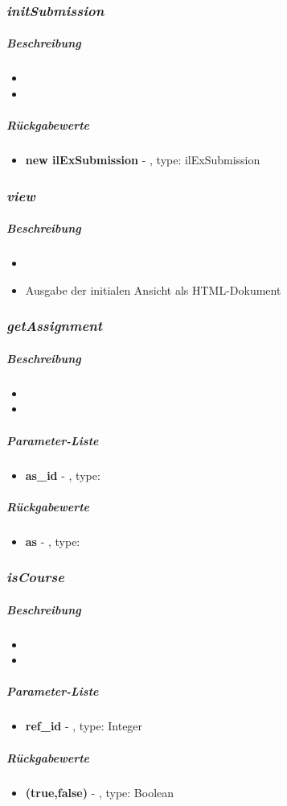 \subsubsection*{\textit{initSubmission}}\label{initSubmissionTGUI}
\subparagraph{Beschreibung}
\begin{itemize}
	\item[] \noindent{}
	\item[] 
\end{itemize}
\subparagraph{Rückgabewerte}
\begin{itemize}
	\item[] \textbf{new ilExSubmission} - , type: ilExSubmission
\end{itemize}

\subsubsection*{\textit{view}}\label{viewTGUI}
\subparagraph{Beschreibung}
\begin{itemize}
	\item[] \noindent{}
	\item[] Ausgabe der initialen Ansicht als HTML-Dokument
\end{itemize}

\subsubsection*{\textit{getAssignment}}\label{getAssignmentTGUI}
\subparagraph{Beschreibung}
\begin{itemize}
	\item[] \noindent{}
	\item[] 
\end{itemize}
\subparagraph{Parameter-Liste}
\begin{itemize}
	\item[] \textbf{as\_id} - , type: 
\end{itemize}
\subparagraph{Rückgabewerte}
\begin{itemize}
	\item[] \textbf{as} - , type: 
\end{itemize}

\subsubsection*{\textit{isCourse}}\label{isCourseTGUI}
\subparagraph{Beschreibung}
\begin{itemize}
	\item[] \noindent{}
	\item[] 
\end{itemize}
\subparagraph{Parameter-Liste}
\begin{itemize}
	\item[] \textbf{ref\_id} - , type: Integer
\end{itemize}
\subparagraph{Rückgabewerte}
\begin{itemize}
	\item[] \textbf{(true,false)} - , type: Boolean
\end{itemize}

